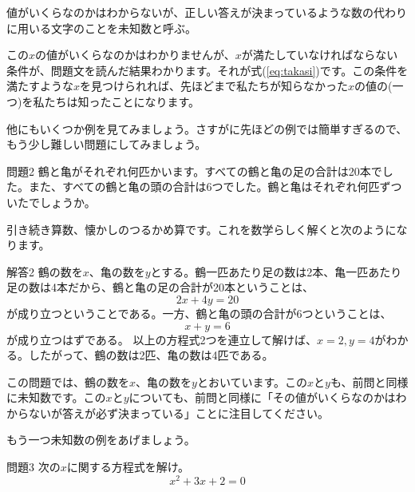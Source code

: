\documentclass[uplatex,dvipdfmx]{jsarticle}
\begin{document}
	\begin{tcolorbox}[title=\gtb{未知数}]
		値がいくらなのかはわからないが、正しい答えが決まっているような数の代わりに用いる文字のことを未知数と呼ぶ。
	\end{tcolorbox}
	
	この$x$の値がいくらなのかはわかりませんが、$x$が満たしていなければならない条件が、問題文を読んだ結果わかります。それが式(\ref{eq:takasi})です。この条件を満たすような$x$を見つけられれば、先ほどまで私たちが知らなかった$x$の値の(一つ)を私たちは知ったことになります。
	
	他にもいくつか例を見てみましょう。さすがに先ほどの例では簡単すぎるので、もう少し難しい問題にしてみましょう。
	
	\begin{itembox}[l]{問題2}
		鶴と亀がそれぞれ何匹かいます。すべての鶴と亀の足の合計は20本でした。また、すべての鶴と亀の頭の合計は6つでした。鶴と亀はそれぞれ何匹ずついたでしょうか。
	\end{itembox}
	
	引き続き算数、懐かしのつるかめ算です。これを数学らしく解くと次のようになります。
	
	\begin{itembox}[l]{解答2}
		鶴の数を$x$、亀の数を$y$とする。鶴一匹あたり足の数は2本、亀一匹あたり足の数は4本だから、鶴と亀の足の合計が20本ということは、
		\begin{equation}
			2x+4y = 20
		\end{equation}
		が成り立つということである。一方、鶴と亀の頭の合計が6つということは、
		\begin{equation}
			x+y = 6
		\end{equation}
		が成り立つはずである。
		以上の方程式2つを連立して解けば、$x=2, y=4$がわかる。したがって、鶴の数は2匹、亀の数は4匹である。
	\end{itembox}	
	
	この問題では、鶴の数を$x$、亀の数を$y$とおいています。この$xとy$も、前問と同様に未知数です。この$x$と$y$についても、前問と同様に「その値がいくらなのかはわからないが答えが必ず決まっている」ことに注目してください。
	
	もう一つ未知数の例をあげましょう。
	
	\begin{itembox}[l]{問題3}
		次の$x$に関する方程式を解け。
		\begin{equation}
			x^2+3x+2 = 0　\label{eq:deg2}
		\end{equation}
	\end{itembox}
	
\end{document}
